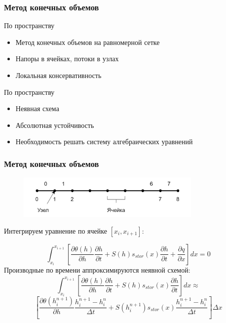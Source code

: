 \documentclass{beamer}
\begin{document}
	
	\begin{frame}
		\frametitle{Метод конечных объемов}
		По пространству
		\begin{itemize}
			\item Метод конечных объемов на равномерной сетке
			\item Напоры в ячейках, потоки в узлах
			\item Локальная консервативность
		\end{itemize}
		
		
		По пространству
		\begin{itemize}
			\item Неявная схема
			\item Абсолютная устойчивость
			\item Необходимость решать систему алгебраических уравнений
		\end{itemize}
	\end{frame}
	
	\begin{frame}
	\frametitle{Метод конечных объемов}
	\begin{figure}[h] \centering
		\includegraphics[width=0.8\textwidth]{mesh1d}
	\end{figure}
	Интегрируем уравнение по ячейке  $[x_i, x_{i+1}]$:
	
	\begin{equation*}
		\int_{x_i}^{x_{i+1}}\left[ \frac{\partial \theta(h)}{\partial h}
		\frac{\partial h}{\partial t} + S(h)s_{stor}(x)\frac{\partial h}{\partial t}
		+
		\frac{\partial q}{\partial x}
		\right]dx = 0
	\end{equation*}
	Производные по времени аппроксимируются неявной схемой:
	\begin{equation*}
		\int_{x_i}^{x_{i+1}}\left[ \frac{\partial \theta(h)}{\partial h}
		\frac{\partial h}{\partial t} + S(h)s_{stor}(x)\frac{\partial h}{\partial t}
		\right]dx \approx
	\end{equation*}
	\begin{equation*}\left[ \frac{\partial \theta(h^{n+1}_i)}{\partial h}
		\frac{h_i^{n+1} - h_i^{n}}{\Delta t} + S(h_i^{n+1})s_{stor}(x)\frac{h_i^{n+1} - h_i^n}{\Delta t}
		\right]\Delta x
	\end{equation*}
	\end{frame}
	
\end{document}
